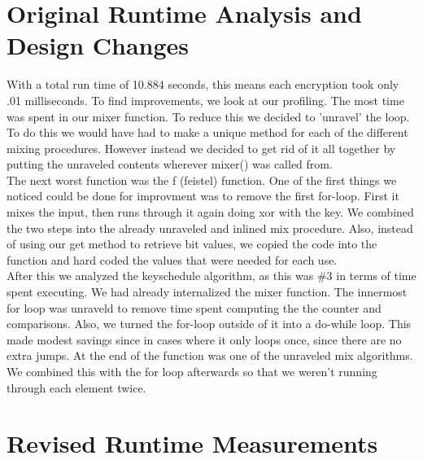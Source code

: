 \documentclass[10pt]{article}
\begin{document}
\section{Original Runtime Analysis and Design Changes}
\indent With a total run time of 10.884 seconds, this means each encryption took only .01 milliseconds.  To find improvements, we look at our profiling.  The most time was spent in our mixer function.  To reduce this we decided to 'unravel' the loop.  To do this we would have had to make a unique method for each of the different mixing procedures.  However instead we decided to get rid of it all together by putting the unraveled contents wherever mixer() was called from.
\\ \indent The next worst function was the f (feistel) function.  One of the first things we noticed could be done for improvment was to remove the first for-loop. First it mixes the input, then runs through it again doing xor with the key. We combined the two steps into the already unraveled and inlined mix procedure. Also, instead of using our get method to retrieve bit values, we copied the code into the function and hard coded the values that were needed for each use.
\\ \indent After this we analyzed the keyschedule algorithm, as this was \#3 in terms of time spent executing.  We had already internalized the mixer function.  The innermost for loop was unraveld to remove time spent computing the the counter and comparisons.  Also, we turned the for-loop outside of it into a do-while loop.  This made modest savings since in cases where it only loops once, since there are no extra jumps.  At the end of the function was one of the unraveled mix algorithms.  We combined this with the for loop afterwards so that we weren't running through each element twice.

\section{Revised Runtime Measurements}
\end{document}
